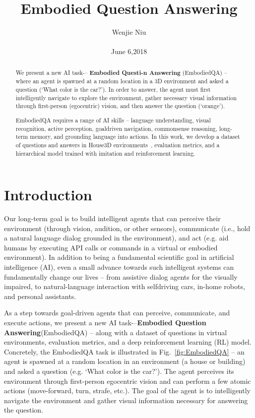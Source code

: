 \documentclass[10pt,twocolumn,letterpaper]{article}
\begin{document}
\title{Embodied Question Answering}

\author{Wenjie Niu\\\\ June 6,2018}

\maketitle

\begin{abstract}
  \cite{Das_2018_CVPR}We present a new AI task-– \textbf{Embodied Questi-n Answering}
(EmbodiedQA) – where an agent is spawned at a random
location in a 3D environment and asked a question (`What
color is the car?'). In order to answer, the agent must first intelligently
navigate to explore the environment, gather necessary
visual information through first-person (egocentric)
vision, and then answer the question (`orange').\par
EmbodiedQA requires a range of AI skills – language understanding,
visual recognition, active perception, goaldriven
navigation, commonsense reasoning, long-term
memory, and grounding language into actions. In this work,
we develop a dataset of questions and answers in House3D
environments~\cite{Wu2018Building}, evaluation metrics, and a hierarchical
model trained with imitation and reinforcement learning.\par
\end{abstract}

\section{Introduction}
Our long-term goal is to build intelligent agents that can
perceive their environment (through vision, audition, or
other sensors), communicate (i.e., hold a natural language
dialog grounded in the environment), and act (e.g. aid humans
by executing API calls or commands in a virtual or
embodied environment). In addition to being a fundamental
scientific goal in artificial intelligence (AI), even a small
advance towards such intelligent systems can fundamentally
change our lives – from assistive dialog agents for the visually
impaired, to natural-language interaction with selfdriving
cars, in-home robots, and personal assistants.\par
As a step towards goal-driven agents that can perceive, communicate,
and execute actions, we present a new AI task-–\textbf{Embodied Question Answering}(EmbodiedQA) – along with a dataset of questions in virtual environments, evaluation
metrics, and a deep reinforcement learning (RL) model.
Concretely, the EmbodiedQA task is illustrated in Fig.~\ref{fig:EmbodiedQA} –
an agent is spawned at a random location in an environment
(a house or building) and asked a question (e.g. `What color
is the car?'). The agent perceives its environment through
first-person egocentric vision and can perform a few atomic
actions (move-forward, turn, strafe, etc.). The goal of the
agent is to intelligently navigate the environment and gather
visual information necessary for answering the question.
\end{document}
